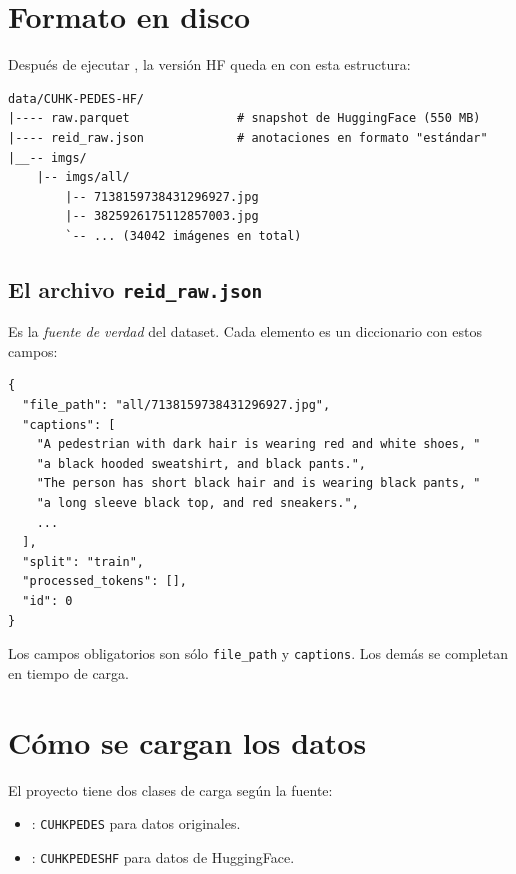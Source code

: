 \section{Formato en disco}

Después de ejecutar , la
versión HF queda en  con esta
estructura:

\begin{verbatim}
data/CUHK-PEDES-HF/
|---- raw.parquet               # snapshot de HuggingFace (550 MB)
|---- reid_raw.json             # anotaciones en formato "estándar"
|__-- imgs/
    |-- imgs/all/
        |-- 7138159738431296927.jpg
        |-- 3825926175112857003.jpg
        `-- ... (34042 imágenes en total)
\end{verbatim}

\subsection{El archivo \texttt{reid\_raw.json}}

Es la \emph{fuente de verdad} del dataset. Cada elemento es un
diccionario con estos campos:

\begin{verbatim}
{
  "file_path": "all/7138159738431296927.jpg",
  "captions": [
    "A pedestrian with dark hair is wearing red and white shoes, "
    "a black hooded sweatshirt, and black pants.",
    "The person has short black hair and is wearing black pants, "
    "a long sleeve black top, and red sneakers.",
    ...
  ],
  "split": "train",
  "processed_tokens": [],
  "id": 0
}
\end{verbatim}

\noindent Los campos obligatorios son sólo \texttt{file\_path} y
\texttt{captions}. Los demás se completan en tiempo de carga.

\section{Cómo se cargan los datos}

El proyecto tiene dos clases de carga según la fuente:

\begin{itemize}
  \item {}: \texttt{CUHKPEDES} para
        datos originales.
  \item {}: \texttt{CUHKPEDESHF}
        para datos de HuggingFace.
\end{itemize}

